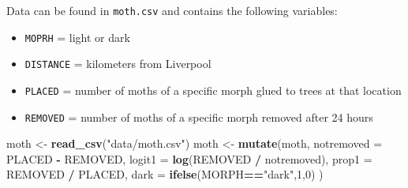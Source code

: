 \documentclass[
]{krantz}
\newenvironment{Shaded}{\begin{snugshade}}{\end{snugshade}}
\newcommand{\DataTypeTok}[1]{\textcolor[rgb]{0.27,0.27,0.27}{#1}}
\newcommand{\DecValTok}[1]{\textcolor[rgb]{0.06,0.06,0.06}{#1}}
\newcommand{\KeywordTok}[1]{\textcolor[rgb]{0.27,0.27,0.27}{\textbf{#1}}}
\newcommand{\NormalTok}[1]{#1}
\newcommand{\OperatorTok}[1]{\textcolor[rgb]{0.43,0.43,0.43}{\textbf{#1}}}
\newcommand{\StringTok}[1]{\textcolor[rgb]{0.5,0.5,0.5}{#1}}
\providecommand{\tightlist}{%
  \setlength{\itemsep}{0pt}\setlength{\parskip}{0pt}}
\begin{document}
Data can be found in \texttt{moth.csv} and contains the following variables:

\begin{itemize}
\tightlist
\item
  \texttt{MOPRH} = light or dark
\item
  \texttt{DISTANCE} = kilometers from Liverpool
\item
  \texttt{PLACED} = number of moths of a specific morph glued to trees at that location
\item
  \texttt{REMOVED} = number of moths of a specific morph removed after 24 hours
\end{itemize}

\begin{Shaded}
\begin{Highlighting}[]
\NormalTok{moth <-}\StringTok{ }\KeywordTok{read_csv}\NormalTok{(}\StringTok{"data/moth.csv"}\NormalTok{)}
\NormalTok{moth <-}\StringTok{ }\KeywordTok{mutate}\NormalTok{(moth, }\DataTypeTok{notremoved =}\NormalTok{ PLACED }\OperatorTok{-}\StringTok{ }\NormalTok{REMOVED, }
               \DataTypeTok{logit1 =} \KeywordTok{log}\NormalTok{(REMOVED }\OperatorTok{/}\StringTok{ }\NormalTok{notremoved),}
               \DataTypeTok{prop1 =}\NormalTok{ REMOVED }\OperatorTok{/}\StringTok{ }\NormalTok{PLACED, }
               \DataTypeTok{dark =} \KeywordTok{ifelse}\NormalTok{(MORPH}\OperatorTok{==}\StringTok{"dark"}\NormalTok{,}\DecValTok{1}\NormalTok{,}\DecValTok{0}\NormalTok{) )}
\end{Highlighting}
\end{Shaded}
\end{document}
